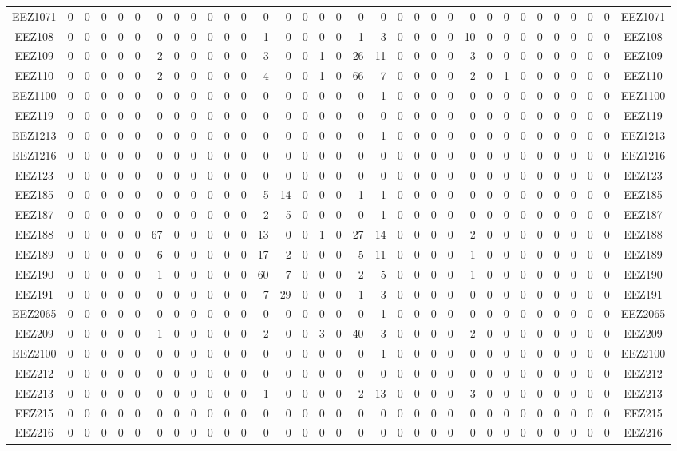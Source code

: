 \documentclass[10pt,a4paper,twoside]{report}
\begin{document}
{\begin{tabular}{crrrrrrrrrrrrrrrrrrrrrrrrrrrrrrrc}
EEZ1071&0&0&0&0&0&0&0&0&0&0&0&0&0&0&0&0&0&0&0&0&0&0&0&0&0&0&0&0&0&0&0&EEZ1071\\
EEZ108&0&0&0&0&0&0&0&0&0&0&0&1&0&0&0&0&1&3&0&0&0&0&10&0&0&0&0&0&0&0&0&EEZ108\\
EEZ109&0&0&0&0&0&2&0&0&0&0&0&3&0&0&1&0&26&11&0&0&0&0&3&0&0&0&0&0&0&0&0&EEZ109\\
EEZ110&0&0&0&0&0&2&0&0&0&0&0&4&0&0&1&0&66&7&0&0&0&0&2&0&1&0&0&0&0&0&0&EEZ110\\
EEZ1100&0&0&0&0&0&0&0&0&0&0&0&0&0&0&0&0&0&1&0&0&0&0&0&0&0&0&0&0&0&0&0&EEZ1100\\
EEZ119&0&0&0&0&0&0&0&0&0&0&0&0&0&0&0&0&0&0&0&0&0&0&0&0&0&0&0&0&0&0&0&EEZ119\\
EEZ1213&0&0&0&0&0&0&0&0&0&0&0&0&0&0&0&0&0&1&0&0&0&0&0&0&0&0&0&0&0&0&0&EEZ1213\\
EEZ1216&0&0&0&0&0&0&0&0&0&0&0&0&0&0&0&0&0&0&0&0&0&0&0&0&0&0&0&0&0&0&0&EEZ1216\\
EEZ123&0&0&0&0&0&0&0&0&0&0&0&0&0&0&0&0&0&0&0&0&0&0&0&0&0&0&0&0&0&0&0&EEZ123\\
EEZ185&0&0&0&0&0&0&0&0&0&0&0&5&14&0&0&0&1&1&0&0&0&0&0&0&0&0&0&0&0&0&0&EEZ185\\
EEZ187&0&0&0&0&0&0&0&0&0&0&0&2&5&0&0&0&0&1&0&0&0&0&0&0&0&0&0&0&0&0&0&EEZ187\\
EEZ188&0&0&0&0&0&67&0&0&0&0&0&13&0&0&1&0&27&14&0&0&0&0&2&0&0&0&0&0&0&0&0&EEZ188\\
EEZ189&0&0&0&0&0&6&0&0&0&0&0&17&2&0&0&0&5&11&0&0&0&0&1&0&0&0&0&0&0&0&0&EEZ189\\
EEZ190&0&0&0&0&0&1&0&0&0&0&0&60&7&0&0&0&2&5&0&0&0&0&1&0&0&0&0&0&0&0&0&EEZ190\\
EEZ191&0&0&0&0&0&0&0&0&0&0&0&7&29&0&0&0&1&3&0&0&0&0&0&0&0&0&0&0&0&0&0&EEZ191\\
EEZ2065&0&0&0&0&0&0&0&0&0&0&0&0&0&0&0&0&0&1&0&0&0&0&0&0&0&0&0&0&0&0&0&EEZ2065\\
EEZ209&0&0&0&0&0&1&0&0&0&0&0&2&0&0&3&0&40&3&0&0&0&0&2&0&0&0&0&0&0&0&0&EEZ209\\
EEZ2100&0&0&0&0&0&0&0&0&0&0&0&0&0&0&0&0&0&1&0&0&0&0&0&0&0&0&0&0&0&0&0&EEZ2100\\
EEZ212&0&0&0&0&0&0&0&0&0&0&0&0&0&0&0&0&0&0&0&0&0&0&0&0&0&0&0&0&0&0&0&EEZ212\\
EEZ213&0&0&0&0&0&0&0&0&0&0&0&1&0&0&0&0&2&13&0&0&0&0&3&0&0&0&0&0&0&0&0&EEZ213\\
EEZ215&0&0&0&0&0&0&0&0&0&0&0&0&0&0&0&0&0&0&0&0&0&0&0&0&0&0&0&0&0&0&0&EEZ215\\
EEZ216&0&0&0&0&0&0&0&0&0&0&0&0&0&0&0&0&0&0&0&0&0&0&0&0&0&0&0&0&0&0&0&EEZ216\\

\end{tabular}}
\end{document}
